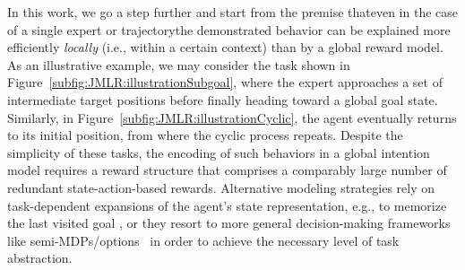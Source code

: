 \documentclass[twoside,11pt]{article}
\newcommand{\eg}{e.g.}
\newcommand{\einschub}[1]{\Emdash*#1\Emdash*}
\begin{document}
In this work, we go a step further and start from the premise that\einschub{even in the case of a single expert or trajectory}the demonstrated behavior can be %
explained more efficiently %
\textit{locally} (i.e., within a certain context) %
than by a global reward %
model.
As an illustrative example, we may consider the task shown in Figure~\ref{subfig:JMLR:illustrationSubgoal}, where the %
expert approaches a set of intermediate target positions before finally heading toward a global goal state. Similarly, in Figure~\ref{subfig:JMLR:illustrationCyclic}, the agent eventually returns to its initial position, from where the cyclic process %
repeats. Despite the simplicity of these tasks, the encoding %
of such behaviors in a global intention model %
requires a %
%
reward structure %
%
that %
comprises a comparably
large number of redundant state-action-based %
rewards. Alternative %
modeling strategies 
%
rely on task-dependent expansions of the agent's state representation, \eg, to memorize the last visited goal \citep{hirl2016}, or %
%
they resort to %
more general decision-making frameworks like semi-MDPs/options~\citep{bradtke1995reinforcement,sutton1999between} in order to achieve %
the necessary  %
level of task abstraction. %
\end{document}
